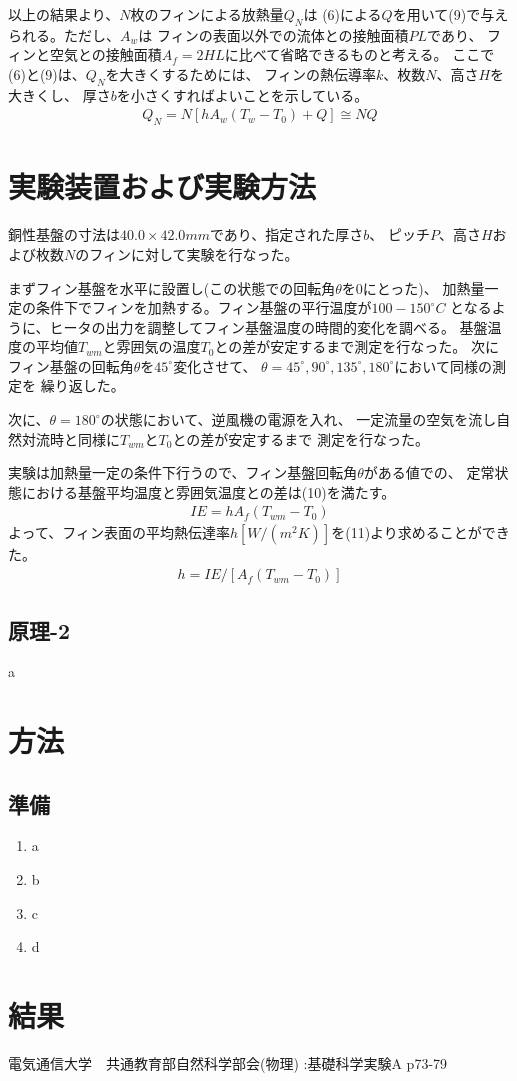 \documentclass[twocolumn, 10pt,a4j]{jsarticle}
\begin{document}
      \par 以上の結果より、$N$枚のフィンによる放熱量$Q_{N}$は
    (6)による$Q$を用いて(9)で与えられる。ただし、$A_{w}$は
    フィンの表面以外での流体との接触面積$PL$であり、
    フィンと空気との接触面積$A_{f}=2HL$に比べて省略できるものと考える。
    ここで(6)と(9)は、$Q_{N}$を大きくするためには、
    フィンの熱伝導率$k$、枚数$N$、高さ$H$を大きくし、
    厚さ$b$を小さくすればよいことを示している。
    \begin{eqnarray}
      Q_{N} = N[hA_{w} (T_{w} - T_{0}) + Q] \cong NQ
    \end{eqnarray}

\section{実験装置および実験方法}
    \par 銅性基盤の寸法は$40.0 \times 42.0 mm$であり、指定された厚さ$b$、
  ピッチ$P$、高さ$H$および枚数$N$のフィンに対して実験を行なった。
    \par まずフィン基盤を水平に設置し(この状態での回転角$\theta$を0にとった)、
  加熱量一定の条件下でフィンを加熱する。フィン基盤の平行温度が$100 - 150 ^\circ C$
  となるように、ヒータの出力を調整してフィン基盤温度の時間的変化を調べる。
  基盤温度の平均値$T_{wm}$と雰囲気の温度$T_{0}$との差が安定するまで測定を行なった。
  次にフィン基盤の回転角$\theta$を$45^\circ$変化させて、
  $\theta = 45^\circ, 90^\circ, 135^\circ, 180^\circ$において同様の測定を
  繰り返した。
    \par 次に、$\theta = 180^\circ$の状態において、逆風機の電源を入れ、
    一定流量の空気を流し自然対流時と同様に$T_{wm}$と$T_{0}$との差が安定するまで
  測定を行なった。
    \par 実験は加熱量一定の条件下行うので、フィン基盤回転角$\theta$がある値での、
  定常状態における基盤平均温度と雰囲気温度との差は(10)を満たす。
    \begin{eqnarray}
      IE = hA_{f}(T_{wm} - T_{0})
    \end{eqnarray}
  よって、フィン表面の平均熱伝達率$h[W/(m^{2}K)]$を(11)より求めることができた。
    \begin{eqnarray}
      h = IE / [A_{f}(T_{wm} - T_{0})]
    \end{eqnarray}

\subsection{原理-2}a
\section{方法}
\subsection{準備}
\begin{enumerate}
\item a
\item b
\item c
\item d
\end{enumerate}
\section{結果}
\begin{thebibliography}{3}
\bibitem{}電気通信大学　共通教育部自然科学部会(物理) :基礎科学実験A p73-79
\end{thebibliography}
\end{document}
